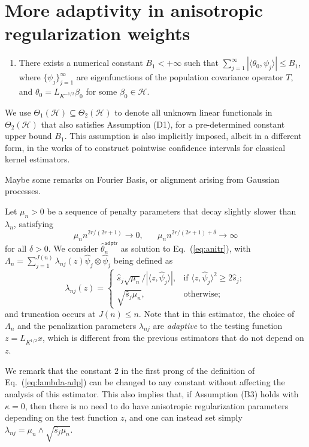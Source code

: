 \documentclass[11pt,a4paper]{article}
\renewcommand{\hat}{\widehat}
\theoremstyle{definition}
\theoremstyle{plain}
\theoremstyle{remark}
\newcommand{\mH}{\mathcal H}
\newcommand{\adptr}{\mathsf{adptr}}
\begin{document}
\section{More adaptivity in anisotropic regularization weights}\label{sec:adptr}

\begin{enumerate}
\item[(D1)] There exists a numerical constant $B_1<+\infty$ such that $\sum_{j=1}^{\infty}|\langle \theta_0, \psi_j\rangle| \leq B_1$, where $\{\psi_j\}_{j=1}^{\infty}$ are eigenfunctions of the population covariance operator $T$,
and $\theta_0=L_{K^{-1/2}}\beta_0$ for some $\beta_0\in\mH$.
\end{enumerate}
We use $\Theta_1(\mH)\subseteq\Theta_2(\mH)$ to denote all unknown linear functionals in $\Theta_2(\mH)$ that also satisfies Assumption (D1), for a pre-determined constant upper bound $B_1$.
This assumption is also implicitly imposed, albeit in a different form, in the works of \cite{liu2025scalable} to construct pointwise confidence intervals for classical kernel estimators.

{\color{red}Maybe some remarks on Fourier Basis, or alignment arising from Gaussian processes.}

Let $\mu_n>0$ be a sequence of penalty parameters that decay slightly slower than $\lambda_n$, satisfying
\begin{equation}
\mu_n n^{2r/(2r+1)}\to 0,\;\;\;\;\;\;\mu_n n^{2r/(2r+1)+\delta}\to\infty
\label{eq:mun}
\end{equation}
for all $\delta>0$.
We consider $\hat\theta_n^\adptr$ as solution to Eq.~(\ref{eq:anitr}), with $\Lambda_n=\sum_{j=1}^{J(n)}\lambda_{nj}(z)\hat\psi_j\otimes\hat\psi_j$ being defined as
\begin{equation}
\lambda_{nj}(z) = \left\{\begin{array}{ll}\hat s_j\sqrt{\mu_n}/|\langle z,\hat\psi_j\rangle|,&\text{if } \langle z,\hat\psi_j\rangle^2\geq 2\hat s_j;\\  \sqrt{\hat s_j\mu_n},& \text{otherwise};\end{array}\right.
\label{eq:lambda-adp}
\end{equation}
and truncation occurs at $J(n)\leq n$.
Note that in this estimator, the choice of $\Lambda_n$ and the penalization parameters $\lambda_{nj}$ are \emph{adaptive} to the testing function $z=L_{K^{1/2}}x$,
which is different from the previous estimators that do not depend on $z$.

We remark that the constant $2$ in the first prong of the definition of Eq.~(\ref{eq:lambda-adp}) can be changed to any constant without affecting the analysis of this estimator.
This also implies that, if Assumption (B3) holds with $\kappa=0$, then there is no need to do have anisotropic regularization parameters depending on
the test function $z$, and one can instead set simply $\lambda_{nj}= \mu_n\wedge\sqrt{\hat s_j\mu_n}$.
\end{document}
